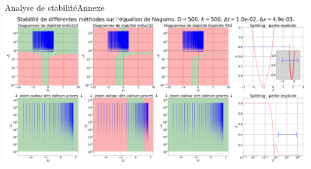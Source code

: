 \begin{frame}{Analyse de stabilité}{Annexe}
    \includegraphics[width = \textwidth]{medias/2_/1_/STABILITE_D500_k500_dt1.0e-02_dx4.9e-03.png}
\end{frame}